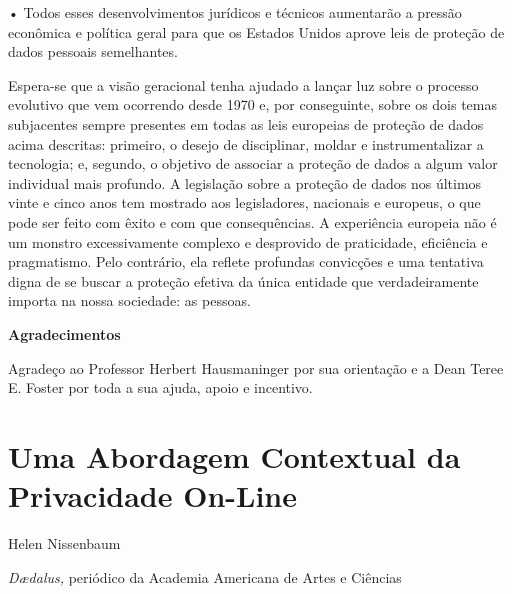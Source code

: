 • Todos esses desenvolvimentos jurídicos e técnicos aumentarão a pressão
econômica e política geral para que os Estados Unidos aprove leis de
proteção de dados pessoais semelhantes.

Espera-se que a visão geracional tenha ajudado a lançar luz sobre o
processo evolutivo que vem ocorrendo desde 1970 e, por conseguinte,
sobre os dois temas subjacentes sempre presentes em todas as leis
europeias de proteção de dados acima descritas: primeiro, o desejo de
disciplinar, moldar e instrumentalizar a tecnologia; e, segundo, o
objetivo de associar a proteção de dados a algum valor individual mais
profundo. A legislação sobre a proteção de dados nos últimos vinte e
cinco anos tem mostrado aos legisladores, nacionais e europeus, o que
pode ser feito com êxito e com que consequências. A experiência europeia
não é um monstro excessivamente complexo e desprovido de praticidade,
eficiência e pragmatismo. Pelo contrário, ela reflete profundas
convicções e uma tentativa digna de se buscar a proteção efetiva da
única entidade que verdadeiramente importa na nossa sociedade: as
pessoas.

\textbf{Agradecimentos}

Agradeço ao Professor Herbert Hausmaninger por sua orientação e a Dean
Teree E. Foster por toda a sua ajuda, apoio e incentivo.

\chapter{Uma Abordagem Contextual da Privacidade
On-Line}\label{uma-abordagem-contextual-da-privacidade-on-line}

Helen Nissenbaum

\emph{Dædalus,} periódico da Academia Americana de Artes e Ciências

